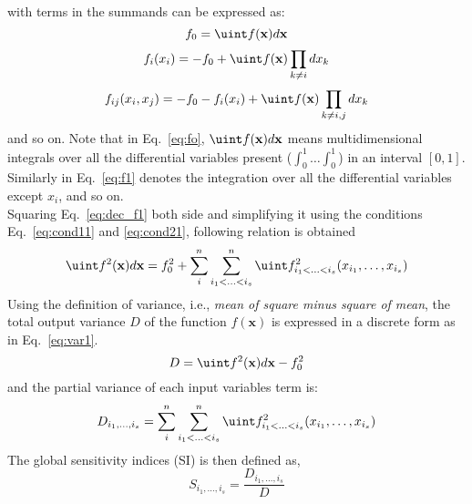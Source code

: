 with terms in the summands can be expressed as:
\begin{equation} \label{eq:fo}
f_0 = \displaystyle \uint f(\mathbf{x})d\mathbf{x} 
\end{equation}
\begin{equation} \label{eq:f1}
 f_i(x_i) = -f_0 + \displaystyle  \uint   f(\mathbf{x}) \displaystyle \prod_{k\neq i}dx_k 
\end{equation}
\begin{equation} \label{eq:f2}
f_{ij}(x_i,x_j) = -f_0 - f_i(x_i) + \displaystyle  \uint   f(\mathbf{x}) \displaystyle \prod_{k\neq i,j}dx_k 
\end{equation}
and so on. Note that in Eq.~\ref{eq:fo}, $ \displaystyle \uint f(\mathbf{x})d\mathbf{x}$ means multidimensional integrals over all the differential variables present ($ \displaystyle \int_0^1 \ldots \int_0^1 $) in an interval $[0,1]$. Similarly in Eq.~\ref{eq:f1} denotes the integration over all the differential variables except $x_i$, and so on.\\
Squaring Eq.~\ref{eq:dec_f1} both side and simplifying it using the conditions Eq.~\ref{eq:cond11} and \ref{eq:cond21}, following relation is obtained
\begin{equation}
\label{eq:squar_1}
 \displaystyle \uint f^2(\mathbf{x})d\mathbf{x} =  f_{0}^{2} + \sum_i^n \sum_{i_{1}<\ldots<i_{s}}^n \displaystyle \uint f_{i_{1}<\ldots<i_{s}}^{2}(x_{i_1},\ldots,x_{i_s})
\end{equation}
Using the definition of variance, i.e., \textit{mean of square minus square of mean}, the total output variance $D$ of the function $f(\mathbf{x})$ is expressed in a discrete form as in Eq.~\ref{eq:var1}.
\begin{equation}
\label{eq:var1}
D = \displaystyle \uint f^2(\mathbf{x})d\mathbf{x} - f_{0}^{2}  %
\end{equation}
and the partial variance of each input variables term is:
\begin{equation}
\label{eq:var2}
D_{i_{1},\ldots,i_{s}} =  \sum_i^n \sum_{i_{1}<\ldots<i_{s}}^n \displaystyle \uint f_{i_{1}<\ldots<i_{s}}^{2}(x_{i_1},\ldots,x_{i_s})
\end{equation}
 The global sensitivity indices (SI) \citet{sobol2001global} is then defined as,
\begin{equation}
\label{eq:GSI}
S_{i_{1},\ldots,i_{s}} = \frac{D_{i_{1},\ldots,i_{s}}}{D}
\end{equation}
